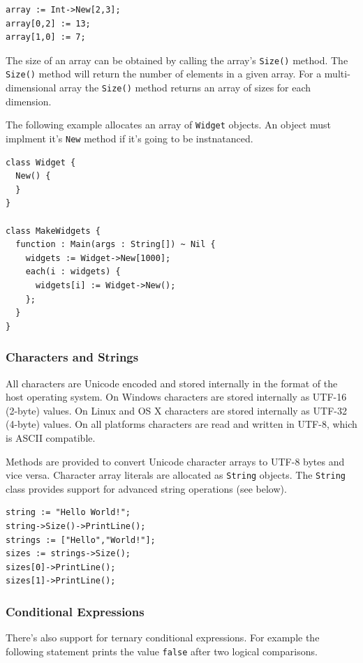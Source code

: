 \documentclass[11pt]{article}
\begin{document}
\begin{verbatim}
array := Int->New[2,3];
array[0,2] := 13;
array[1,0] := 7;
\end{verbatim}

The size of an array can be obtained by calling the array's
\texttt{Size()} method.  The \texttt{Size()} method will return the
number of elements in a given array.  For a multi-dimensional array
the \texttt{Size()} method returns an array of sizes for each
dimension. 

The following example allocates an array of \texttt{Widget} objects.
An object must implment it's \texttt{New} method if it's going to be
instnatanced.

\begin{verbatim}
class Widget {
  New() {
  }
}

class MakeWidgets {
  function : Main(args : String[]) ~ Nil {
    widgets := Widget->New[1000];
    each(i : widgets) {
      widgets[i] := Widget->New();
    };
  }
}
\end{verbatim}

\subsubsection{Characters and Strings}
All characters are Unicode encoded and stored internally in the format of the host operating system.  On Windows characters are stored internally as UTF-16 (2-byte) values.  On Linux and OS X characters are stored internally as UTF-32 (4-byte) values.  On all platforms characters are read and written in UTF-8, which is ASCII compatible.  

Methods are provided to convert Unicode character arrays to UTF-8 bytes and vice versa.  Character array literals are allocated as \texttt{String} objects.  The \texttt{String} class provides support for advanced string operations (see below).

\begin{verbatim}
string := "Hello World!";
string->Size()->PrintLine();
strings := ["Hello","World!"];
sizes := strings->Size();
sizes[0]->PrintLine();
sizes[1]->PrintLine();
\end{verbatim}

\subsubsection{Conditional Expressions}
There's also support for ternary conditional expressions.  For example
the following statement prints the value \texttt{false} after two
logical comparisons.
\end{document}
